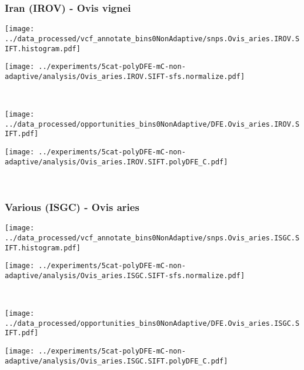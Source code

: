 \subsubsection{Iran (IROV) - Ovis vignei}

\begin{minipage}{0.49\linewidth}
    \texttt{[image: ../data\_processed/vcf\_annotate\_bins0NonAdaptive/snps.Ovis\_aries.IROV.SIFT.histogram.pdf]}
\end{minipage}
\begin{minipage}{0.49\linewidth}
    \texttt{[image: ../experiments/5cat-polyDFE-mC-non-adaptive/analysis/Ovis\_aries.IROV.SIFT-sfs.normalize.pdf]}
\end{minipage}
\\
\begin{minipage}{0.49\linewidth}
    \texttt{[image: ../data\_processed/opportunities\_bins0NonAdaptive/DFE.Ovis\_aries.IROV.SIFT.pdf]}
\end{minipage}
\begin{minipage}{0.49\linewidth}
    \texttt{[image: ../experiments/5cat-polyDFE-mC-non-adaptive/analysis/Ovis\_aries.IROV.SIFT.polyDFE\_C.pdf]}
\end{minipage}
\\

\subsubsection{Various (ISGC) - Ovis aries}

\begin{minipage}{0.49\linewidth}
    \texttt{[image: ../data\_processed/vcf\_annotate\_bins0NonAdaptive/snps.Ovis\_aries.ISGC.SIFT.histogram.pdf]}
\end{minipage}
\begin{minipage}{0.49\linewidth}
    \texttt{[image: ../experiments/5cat-polyDFE-mC-non-adaptive/analysis/Ovis\_aries.ISGC.SIFT-sfs.normalize.pdf]}
\end{minipage}
\\
\begin{minipage}{0.49\linewidth}
    \texttt{[image: ../data\_processed/opportunities\_bins0NonAdaptive/DFE.Ovis\_aries.ISGC.SIFT.pdf]}
\end{minipage}
\begin{minipage}{0.49\linewidth}
    \texttt{[image: ../experiments/5cat-polyDFE-mC-non-adaptive/analysis/Ovis\_aries.ISGC.SIFT.polyDFE\_C.pdf]}
\end{minipage}
\\

